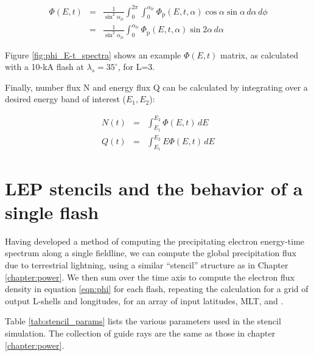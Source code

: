 \begin{eqnarray}
\Phi(E,t)& = &\frac{1}{\sin^2\alpha_{lc}}\int_0^{2\pi}\int_0^{\alpha_{lc}}\Phi_\mathrm{p}(E,t,\alpha) \cos\alpha \sin\alpha\,d\alpha\,d\phi \\
&=& \frac{1}{\sin^2\alpha_{lc}} \int_0^{\alpha_{lc}}\Phi_\mathrm{p}(E,t,\alpha) \sin 2\alpha\,d\alpha
\label{eqn:phi}
\end{eqnarray}

Figure \ref{fig:phi_E-t_spectra} shows an example $\Phi(E,t)$ matrix, as calculated with a 10-kA flash at $\lambda_s=35^\circ$, for L=3.


Finally, number flux N and energy flux Q can be calculated by integrating over a desired energy band of interest ($E_1, E_2$):

\begin{eqnarray}
N(t) &=& \int_{E_1}^{E_2} \Phi(E,t)\,dE \\
Q(t) &=& \int_{E_1}^{E_2} E \Phi(E,t)\,dE
\end{eqnarray}



\section{LEP stencils and the behavior of a single flash}
\label{section:lep_stencils}
Having developed a method of computing the precipitating electron energy-time spectrum along a single fieldline, we can compute the global precipitation flux due to terrestrial lightning, using a similar ``stencil'' structure as in Chapter \ref{chapter:power}. We then sum over the time axis to compute the electron flux density in equation \eqref{eqn:phi} for each flash, repeating the calculation for a grid of output L-shells and longitudes, for an array of input latitudes, MLT, and \kp{}.

Table \ref{tab:stencil_params} lists the various parameters used in the stencil simulation. The collection of guide rays are the same as those in chapter \ref{chapter:power}.



